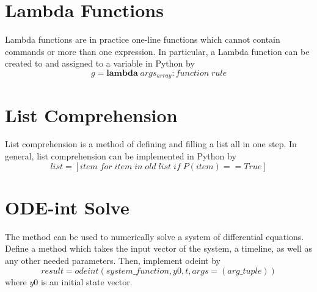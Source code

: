 \documentclass[12pt, a4paper, oneside, openright, titlepage]{book}
\begin{document}
\begin{appendices}
        \section{Lambda Functions}

        \begin{defn}
                Lambda functions are in practice one-line functions which cannot contain commands or more than one expression. In particular, a Lambda function can be created to and assigned to a variable in Python by \begin{equation}
                        g = \mathbf{lambda}\;args_{array}:function\;rule
                \end{equation}
        \end{defn}


        \section{List Comprehension}

        \begin{defn}
                List comprehension is a method of defining and filling a list all in one step. In general, list comprehension can be implemented in Python by \begin{equation}
                        list = [item\;for\;item\;in\;old\;list\;if\;P(item) == True]
                \end{equation}
        \end{defn}

        \section{ODE-int Solve}

        \begin{defn}
                The  method can be used to numerically solve a system of differential equations. Define a method which takes the input vector of the system, a timeline, as well as any other needed parameters. Then, implement odeint by \begin{equation}
                        result = odeint(system\_function, y0, t, args = (arg\_tuple))
                \end{equation}
                where $y0$ is an initial state vector.
        \end{defn}
\end{appendices}




\begin{appendices}


\end{appendices}
\end{document}
